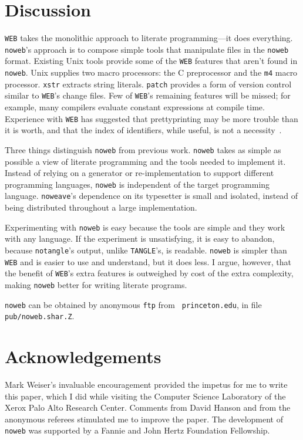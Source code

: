 \section{Discussion}



{\tt WEB} takes the monolithic approach to literate programming---it
does everything.
{\tt noweb}'s approach is to compose
simple tools that manipulate files in the {\tt noweb} format. 
Existing Unix tools provide some of the {\tt WEB} features that
aren't found in \verb+noweb+.
Unix supplies two macro processors: the C
preprocessor and the \verb+m4+ macro processor.
\verb+xstr+ extracts string literals.
\verb+patch+ provides a form of version control similar to {\tt WEB}'s
change files.
Few of {\tt WEB}'s remaining features will be missed; for example, many compilers
evaluate constant expressions at compile time.
Experience with {\tt WEB} has suggested that prettyprinting may be
more trouble than it is worth, and that the index of identifiers,
while useful, is not a necessity~\cite{ramsey:literate}.

Three things distinguish {\tt noweb} from previous work.
{\tt noweb} takes as simple as possible a view of literate programming
and the tools needed to implement it. 
Instead of relying on a generator or re-implementation to support
different programming languages, {\tt noweb} is independent of the
target programming language.
{\tt noweave}'s dependence on its typesetter is small and isolated,
instead of being distributed throughout a large implementation.

Experimenting with {\tt noweb} is easy because the tools are simple
and they work with any language.
If the experiment is unsatisfying, it is easy to abandon, because 
\verb+notangle+'s output, unlike {\tt TANGLE}'s, is readable.
\verb+noweb+ is simpler than {\tt WEB} and is easier to use and
understand, but it does less.
I argue, however, that the benefit of {\tt WEB}'s extra features is
outweighed by cost of the extra complexity,
making \verb+noweb+  better for writing literate programs.

\verb+noweb+ can be obtained by 
anonymous {\tt ftp} from  {\tt
princeton.edu}, in file {\tt pub/noweb.shar.Z}.

\section{Acknowledgements}
Mark Weiser's invaluable encouragement provided the impetus for me to
write this paper, which I did while visiting the Computer
Science Laboratory of the Xerox Palo Alto Research Center.
Comments from David Hanson and from the anonymous referees stimulated
me to improve the paper.
The development of {\tt noweb} was supported by a Fannie and John Hertz
Foundation Fellowship.




\iftr
\clearpage

\fi



